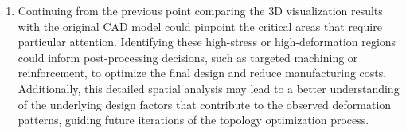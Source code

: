 \documentclass[../main.tex]{subfiles}
\begin{document}
\begin{enumerate}
  \item Continuing from the previous point comparing the 3D visualization results with the original CAD model could pinpoint the critical areas that require particular attention. Identifying these high-stress or high-deformation regions could inform post-processing decisions, such as targeted machining or reinforcement, to optimize the final design and reduce manufacturing costs. Additionally, this detailed spatial analysis may lead to a better understanding of the underlying design factors that contribute to the observed deformation patterns, guiding future iterations of the topology optimization process.

\end{enumerate}
\end{document}
